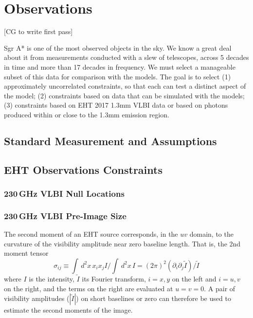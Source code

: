 \section{Observations}\label{sec:observations}

[CG to write first pass]

Sgr A* is one of the most observed objects in the sky.   We know a great deal about it from measurements conducted with a slew of telescopes, across 5 decades in time and more than 17 decades in frequency.  We must select a manageable subset of this data for comparison with the models.  The goal is to select (1) approximately uncorrelated constraints, so that each can test a distinct aspect of the model; (2) constraints based on data that can be simulated with the  models; (3) constraints based on EHT 2017 1.3mm VLBI data or based on photons produced within or close to the 1.3mm emission region.

\subsection{Standard Measurement and Assumptions}


\subsection{EHT Observations Constraints}


\subsubsection{230\,GHz VLBI Null Locations}

\subsubsection{230\,GHz VLBI Pre-Image Size}

The second moment of an EHT source corresponds, in the $uv$ domain, to the curvature of the visibility amplitude near zero baseline length.  That is, the 2nd moment tensor
\begin{equation}
    \sigma_{ij} \equiv \int \, d^2x\, x_i x_j I/\int \, d^2x \, I = (2\pi)^2 \left(\partial_i \partial_j \tilde{I}\right)/\tilde{I}
\end{equation}
where $I$ is the intensity, $\tilde{I}$ its Fourier transform, $i = x,y$ on the left and $i = u,v$ on the right, and the terms on the right are evaluated at $u = v = 0$.  A pair of visibility amplitudes ($|\tilde{I}|$) on short baselines or zero can therefore be used to estimate the second moments of the image.  

